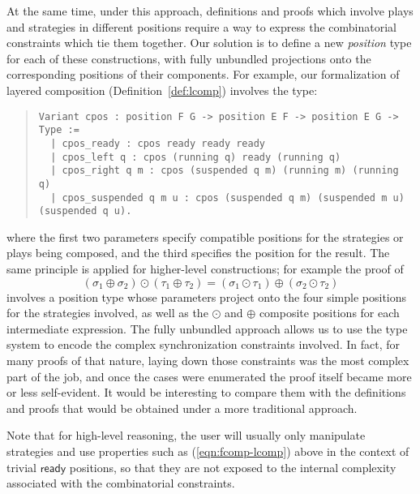 \documentclass[acmsmall,screen,review,nonacm]{acmart}
\newcommand{\kw}[1]{\ensuremath{ \mathsf{#1} }}
\begin{document}
At the same time,
under this approach,
definitions and proofs which involve
plays and strategies in different positions
require a way to express the combinatorial constraints
which tie them together.
Our solution is to define a new \emph{position} type
for each of these constructions,
with fully unbundled projections onto
the corresponding positions of their components.
For example,
our formalization of layered composition (Definition~\ref{def:lcomp})
involves the type:
\begin{quote}\footnotesize
\verb!Variant cpos : position F G -> position E F -> position E G -> Type :=! \\
\verb!  | cpos_ready : cpos ready ready ready! \\
\verb!  | cpos_left q : cpos (running q) ready (running q)! \\
\verb!  | cpos_right q m : cpos (suspended q m) (running m) (running q)! \\
\verb!  | cpos_suspended q m u : cpos (suspended q m) (suspended m u) (suspended q u).!
\end{quote}
where the first two parameters specify compatible positions for
the strategies or plays being composed,
and the third specifies the position for the result.
The same principle is applied for higher-level constructions;
for example the proof of
\begin{equation} \label{eqn:fcomp-lcomp}
  (\sigma_1 \oplus \sigma_2) \odot (\tau_1 \oplus \tau_2) =
  (\sigma_1 \odot \tau_1) \oplus (\sigma_2 \odot \tau_2)
\end{equation}
involves a position type whose parameters project onto
the four simple positions for the strategies involved,
as well as the $\odot$ and $\oplus$ composite positions
for each intermediate expression.
The fully unbundled approach allows us to use the type system
to encode the complex synchronization constraints involved.
In fact,
for many proofs of that nature,
laying down those constraints was the most complex part of the job,
and once the cases were enumerated
the proof itself became more or less self-evident.
It would be interesting to compare them with
the definitions and proofs that would be obtained
under a more traditional approach.

Note that for high-level reasoning,
the user will usually only manipulate strategies and
use properties such as (\ref{eqn:fcomp-lcomp}) above
in the context of trivial $\kw{ready}$ positions,
so that they are not exposed to the internal complexity
associated with the combinatorial constraints.
\end{document}
